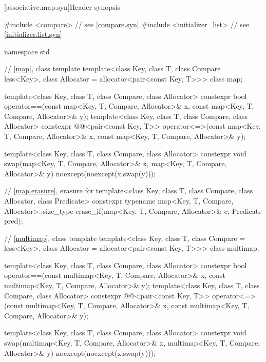 [associative.map.syn]{Header  synopsis}

%
\begin{codeblock}
#include <compare>              // see \ref{compare.syn}
#include <initializer_list>     // see \ref{initializer.list.syn}

namespace std {
  // \ref{map}, class template 
  template<class Key, class T, class Compare = less<Key>,
           class Allocator = allocator<pair<const Key, T>>>
    class map;

  template<class Key, class T, class Compare, class Allocator>
    constexpr bool operator==(const map<Key, T, Compare, Allocator>& x,
                              const map<Key, T, Compare, Allocator>& y);
  template<class Key, class T, class Compare, class Allocator>
    constexpr @@<pair<const Key, T>>
      operator<=>(const map<Key, T, Compare, Allocator>& x,
                  const map<Key, T, Compare, Allocator>& y);

  template<class Key, class T, class Compare, class Allocator>
    constexpr void swap(map<Key, T, Compare, Allocator>& x,
                        map<Key, T, Compare, Allocator>& y)
      noexcept(noexcept(x.swap(y)));

  // \ref{map.erasure}, erasure for 
  template<class Key, class T, class Compare, class Allocator, class Predicate>
    constexpr typename map<Key, T, Compare, Allocator>::size_type
      erase_if(map<Key, T, Compare, Allocator>& c, Predicate pred);

  // \ref{multimap}, class template 
  template<class Key, class T, class Compare = less<Key>,
           class Allocator = allocator<pair<const Key, T>>>
    class multimap;

  template<class Key, class T, class Compare, class Allocator>
    constexpr bool operator==(const multimap<Key, T, Compare, Allocator>& x,
                              const multimap<Key, T, Compare, Allocator>& y);
  template<class Key, class T, class Compare, class Allocator>
    constexpr @@<pair<const Key, T>>
      operator<=>(const multimap<Key, T, Compare, Allocator>& x,
                  const multimap<Key, T, Compare, Allocator>& y);

  template<class Key, class T, class Compare, class Allocator>
    constexpr void swap(multimap<Key, T, Compare, Allocator>& x,
                        multimap<Key, T, Compare, Allocator>& y)
      noexcept(noexcept(x.swap(y)));

}
\end{codeblock}
